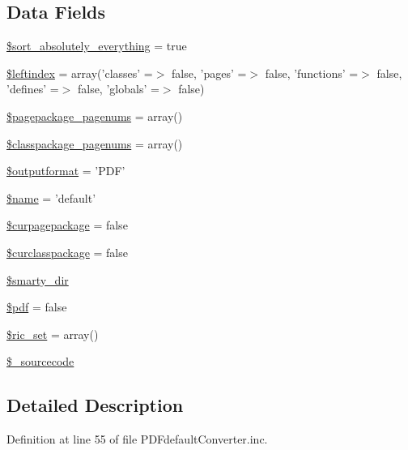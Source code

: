 \subsection*{\-Data \-Fields}
\begin{DoxyCompactItemize}
\item 
\hyperlink{class_p_d_fdefault_converter_a40eea215f3b8eaec5c134f45f62aa100}{\$sort\-\_\-absolutely\-\_\-everything} = true
\item 
\hyperlink{class_p_d_fdefault_converter_ab49669c749559bb7833762878adb8f0c}{\$leftindex} = array('classes' =$>$ false, 'pages' =$>$ false, 'functions' =$>$ false, 'defines' =$>$ false, 'globals' =$>$ false)
\item 
\hyperlink{class_p_d_fdefault_converter_aa99a4943236232e2e3ca6ac77bb1300a}{\$pagepackage\-\_\-pagenums} = array()
\item 
\hyperlink{class_p_d_fdefault_converter_a1848812287db1f25053bd5cb0fa97196}{\$classpackage\-\_\-pagenums} = array()
\item 
\hyperlink{class_p_d_fdefault_converter_af0bfe153c049d957e8ea29b147025108}{\$outputformat} = '\-P\-D\-F'
\item 
\hyperlink{class_p_d_fdefault_converter_ab2fc40d43824ea3e1ce5d86dee0d763b}{\$name} = 'default'
\item 
\hyperlink{class_p_d_fdefault_converter_ab9341729416d2d0888fcefacea4d1a44}{\$curpagepackage} = false
\item 
\hyperlink{class_p_d_fdefault_converter_a10d524694477913d45be2528a61bfa0a}{\$curclasspackage} = false
\item 
\hyperlink{class_p_d_fdefault_converter_afc2adf23943f2cf6a93997e5ab9bca62}{\$smarty\-\_\-dir}
\item 
\hyperlink{class_p_d_fdefault_converter_a964ee5ee597c515cbb4dad2f14054cb4}{\$pdf} = false
\item 
\hyperlink{class_p_d_fdefault_converter_a84e3c5e32f1d02114c9d126d5864d06b}{\$ric\-\_\-set} = array()
\item 
\hyperlink{class_p_d_fdefault_converter_ace9657cda2ef03bba6ebe39d2b17822d}{\$\-\_\-sourcecode}
\end{DoxyCompactItemize}


\subsection{\-Detailed \-Description}


\-Definition at line 55 of file \-P\-D\-Fdefault\-Converter.\-inc.



